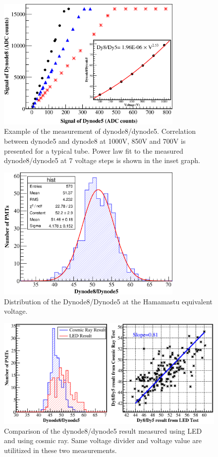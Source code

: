 \documentclass[review,number,sort&compress]{elsarticle}
\begin{document}
\begin{figure}
 \centering
 \includegraphics[width=90mm]{dy58_example}
\caption{Example of the measurement of dynode8/dynode5.
Correlation between dynode5 and dynode8 at 1000V, 850V and 700V is presented for a typical tube.
Power law fit to the measured dynode8/dynode5 at 7 voltage steps is shown in the inset graph.
}
\label{fig:dy58_example}
\end{figure} 

\begin{figure}
 \centering
 \includegraphics[width=90mm]{dy58_dist}
\caption{Distribution of the Dynode8/Dynode5 at the Hamamastu equivalent voltage.}
\label{fig:dy58_dist}
\end{figure} 

\begin{figure}
 \centering
 \includegraphics[width=140mm]{dy58_ledvscm}
\caption{Comparison of the dynode8/dynode5 result measured using LED and using cosmic ray.
Same voltage divider and voltage value are utilitized in these two measurements.}
\label{fig:dy58_ledvscm}
\end{figure} 
\end{document}
